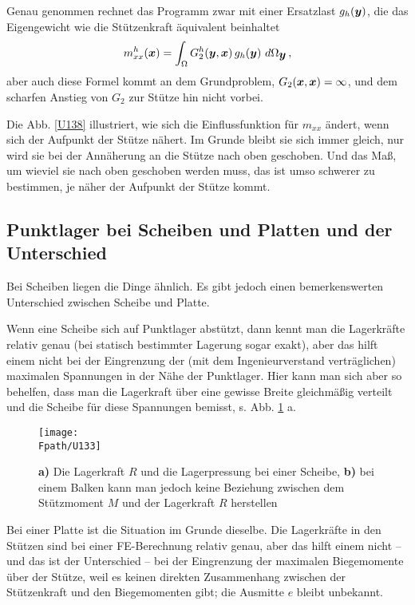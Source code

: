 {Genau genommen rechnet das Programm zwar mit einer Ersatzlast $g_h(\mbox{\boldmath $y$})$, die das Eigengewicht wie die St\"{u}tzenkraft \glq \"{a}quivalent\grq{} beinhaltet
\begin{align}\label{Eq135}
m_{xx}^h(\mbox{\boldmath $x$}) = \int_{\Omega} G_2^h(\mbox{\boldmath $y$},\mbox{\boldmath $x$})\,g_h(\mbox{\boldmath $y$})\,\,d\Omega_{\mbox{\boldmath $y$}}\,,
\end{align}
aber auch diese Formel kommt an dem Grundproblem, $G_2(\mbox{\boldmath $x$}, \mbox{\boldmath $x$}) = \infty$, und dem scharfen Anstieg von $G_2$ zur St\"{u}tze hin nicht vorbei.

Die Abb. \ref{U138} illustriert, wie sich die Einflussfunktion f\"{u}r $m_{xx}$ \"{a}ndert, wenn sich der Aufpunkt der St\"{u}tze n\"{a}hert. Im Grunde bleibt sie sich immer gleich, nur wird sie bei der Ann\"{a}herung an die St\"{u}tze nach oben geschoben. Und das Ma{\ss}, um wieviel sie nach oben geschoben werden muss, das ist umso schwerer zu bestimmen, je n\"{a}her der Aufpunkt der St\"{u}tze kommt.\\

{\textcolor{sectionTitleBlue}{\section{Punktlager bei Scheiben und Platten und der Unterschied}}}
Bei Scheiben liegen die Dinge \"{a}hnlich. Es gibt jedoch einen bemerkenswerten Unterschied zwischen Scheibe und Platte.

Wenn eine Scheibe sich auf Punktlager abst\"{u}tzt, dann kennt man die Lagerkr\"{a}fte relativ genau (bei statisch bestimmter Lagerung sogar exakt), aber das hilft einem nicht bei der Eingrenzung der (mit dem Ingenieurverstand vertr\"{a}glichen) maximalen Spannungen in der N\"{a}he der Punktlager. Hier kann man sich aber so behelfen, dass man die Lagerkraft \"{u}ber eine gewisse Breite gleichm\"{a}{\ss}ig verteilt und die Scheibe f\"{u}r diese Spannungen bemisst, s. Abb. \ref{U133} a.

\begin{figure}[tbp]
\centering
\if {} \sidecaption \fi
\texttt{[image: \\Fpath/U133]}
  \caption{\textbf{ a)} Die Lagerkraft $R$ und die Lagerpressung bei einer Scheibe, \textbf{ b)} bei einem Balken kann man jedoch keine Beziehung zwischen dem St\"{u}tzmoment $M$ und der Lagerkraft $R$ herstellen}
  \label{U133}
\end{figure}
Bei einer Platte ist die Situation im Grunde dieselbe. Die Lagerkr\"{a}fte in den St\"{u}tzen sind bei einer FE-Berechnung relativ genau, aber das hilft einem nicht -- und das ist der Unterschied -- bei der Eingrenzung der maximalen Biegemomente \"{u}ber der St\"{u}tze, weil es keinen direkten Zusammenhang zwischen der St\"{u}tzenkraft und den Biegemomenten gibt; die Ausmitte $e$ bleibt unbekannt.

}
